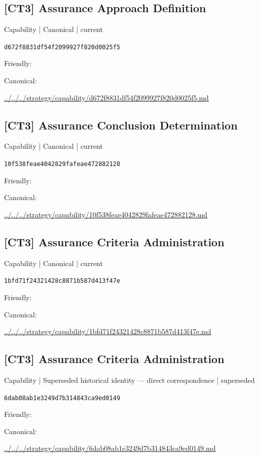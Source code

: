 \documentclass[10pt,a4paper]{article}
\begin{document}
\subsection*{[CT3] Assurance Approach Definition}
{\small Capability | Canonical | current}\par
\texttt{d672f8831df54f2099927f820d0025f5}\par
Friendly: \par
Canonical: \par
{\footnotesize\url{../../../strategy/capability/d672f8831df54f2099927f820d0025f5.md}}\par
\subsection*{[CT3] Assurance Conclusion Determination}
{\small Capability | Canonical | current}\par
\texttt{10f538feae4042829fafeae472882128}\par
Friendly: \par
Canonical: \par
{\footnotesize\url{../../../strategy/capability/10f538feae4042829fafeae472882128.md}}\par
\subsection*{[CT3] Assurance Criteria Administration}
{\small Capability | Canonical | current}\par
\texttt{1bfd71f24321428c8871b587d413f47e}\par
Friendly: \par
Canonical: \par
{\footnotesize\url{../../../strategy/capability/1bfd71f24321428c8871b587d413f47e.md}}\par
\subsection*{[CT3] Assurance Criteria Administration}
{\small Capability | Superseded historical identity — direct correspondence | superseded}\par
\texttt{6dab08ab1e3249d7b314843ca9ed0149}\par
Friendly: \par
Canonical: \par
{\footnotesize\url{../../../strategy/capability/6dab08ab1e3249d7b314843ca9ed0149.md}}\par
\end{document}
